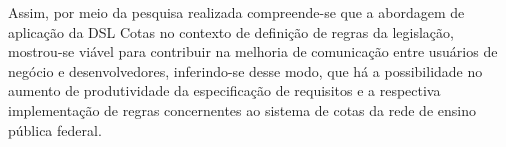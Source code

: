 Assim, por meio da pesquisa realizada compreende-se que a abordagem de aplicação da DSL Cotas no contexto de definição de regras da legislação, mostrou-se viável para contribuir na melhoria de comunicação entre usuários de negócio e desenvolvedores, inferindo-se desse modo, que há a possibilidade no aumento de produtividade da especificação de requisitos e a respectiva implementação de regras concernentes ao sistema de cotas da rede de ensino pública federal.


